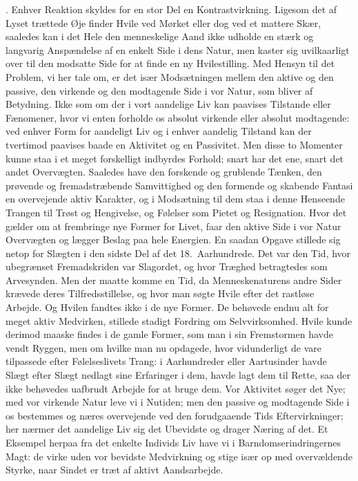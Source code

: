 \documentclass[12pt,a4paper]{article}
\newcommand{\apage}[1]{\marginnote{\footnotesize\textit{[#1]}}}
\begin{document}
\medskip
{}. Enhver Reaktion skyldes for en stor Del en Kontrastvirkning.
Ligesom det af Lyset trættede Øje finder Hvile ved Mørket eller dog ved et
mattere Skær, saaledes kan i det Hele den menneskelige Aand ikke udholde en
stærk og langvarig Anspændelse af en enkelt Side i dens Natur, men kaster sig
uvilkaarligt over til den modsatte Side for at finde en ny Hvilestilling. Med
Hensyn til det Problem, vi her tale om, er det især Modsætningen mellem den
aktive og den passive, den virkende og den modtagende Side i vor Natur, som
bliver af Betydning. Ikke som om der i vort aandelige Liv kan paavises
Tilstande eller Fænomener, hvor vi enten forholde os absolut virkende eller
absolut modtagende: ved enhver Form for aandeligt Liv og i enhver aandelig
Tilstand kan der tvertimod paavises baade en Aktivitet og en Passivitet. Men
disse to Momenter kunne staa i et meget forskelligt indbyrdes Forhold; snart
har det ene, snart det andet Overvægten. Saaledes have den forskende og
grublende Tænken, den prøvende og fremadstræbende Samvittighed og den formende
og skabende Fantasi en overvejende aktiv Karakter, og i Modsætning til dem staa
i denne Henseende Trangen til Trøst og Hengivelse, og Følelser som Pietet og
Resignation. Hvor det gælder om at frembringe nye Former for Livet, faar den
aktive Side i vor Natur Overvægten og \apage{204} lægger Beslag paa hele Energien. En
saadan Opgave stillede sig netop for Slægten i den sidste Del af det
18.\ Aarhundrede. Det var den Tid, hvor ubegrænset Fremadskriden var Slagordet,
og hvor Træghed betragtedes som Arvesynden. Men der maatte komme en Tid, da
Menneskenaturens andre Sider krævede deres Tilfredsstillelse, og hvor man søgte
Hvile efter det rastløse Arbejde. Og Hvilen fandtes ikke i de nye Former. De
behøvede endnu alt for meget aktiv Medvirken, stillede stadigt Fordring om
Selvvirksomhed. Hvile kunde derimod maaske findes i de gamle Former, som man i
sin Fremstormen havde vendt Ryggen, men om hvilke man nu opdagede, hvor
vidunderligt de vare tilpassede efter Følelseslivets Trang: i Aarhundreder eller
Aartusinder havde Slægt efter Slægt nedlagt sine Erfaringer i dem, havde lagt
dem til Rette, saa der ikke behøvedes uafbrudt Arbejde for at bruge dem. Vor
Aktivitet søger det Nye; med vor virkende Natur leve vi i Nutiden; men den
passive og modtagende Side i os bestemmes og næres overvejende ved den
forudgaaende Tids Eftervirkninger; her nærmer det aandelige Liv sig det Ubevidste
og drager Næring af det. Et Eksempel herpaa fra det enkelte Individs Liv have vi
i Barndomserindringernes Magt: de virke uden vor bevidste Medvirkning og stige
især op med overvældende Styrke, naar Sindet er træt af aktivt Aandsarbejde.
\end{document}
